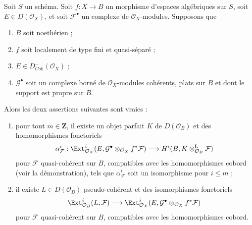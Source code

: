 \begin{lemma}
\label{lemma-compute-ext}
Soit $S$ un sch\'ema. Soit $f:X\to B$ un morphisme d'espaces alg\'ebriques sur
$S$, soit $E\in D(\mathcal{O}_X)$, et soit $\mathcal{F}^\bullet$ un complexe de
$\mathcal{O}_X$-modules. Supposons que
\begin{enumerate}
\item $B$ soit noeth\'erien ;
\item $f$ soit localement de type fini et quasi-s\'epar\'e ;
\item $E\in D^-_{\textit{Coh}}(\mathcal{O}_X)$ ;
\item $\mathcal{G}^\bullet$ soit un complexe born\'e de
$\mathcal{O}_X$-modules coh\'erents, plats sur $B$ et dont le support est propre
sur $B$.
\end{enumerate}
Alors les deux assertions suivantes sont vraies :
\begin{enumerate}
\item[(A)] pour tout $m\in\mathbf{Z}$, il existe un objet parfait $K$ de
$D(\mathcal{O}_B)$ et des homomorphismes fonctoriels
$$
\alpha^i_\mathcal{F} :
\Ext^i_{\mathcal{O}_X}(E,
\mathcal{G}^\bullet \otimes_{\mathcal{O}_X} f^*\mathcal{F})
\longrightarrow
H^i(B, K \otimes^\mathbf{L}_{\mathcal{O}_B} \mathcal{F})
$$
pour $\mathcal{F}$ quasi-coh\'erent sur $B$, compatibles avec les homomorphismes
cobord (voir la d\'emonstration), tels que $\alpha^i_\mathcal{F}$ soit un
isomorphisme pour $i\leq m$ ;
\item[(B)] il existe $L\in D(\mathcal{O}_B)$ pseudo-coh\'erent et des
isomorphismes fonctoriels
$$
\Ext^i_{\mathcal{O}_B}(L, \mathcal{F}) \longrightarrow
\Ext^i_{\mathcal{O}_X}(E,
\mathcal{G}^\bullet \otimes_{\mathcal{O}_X} f^*\mathcal{F})
$$
pour $\mathcal{F}$ quasi-coh\'erent sur $B$, compatibles avec les homomorphismes
cobord.
\end{enumerate}
\end{lemma}

